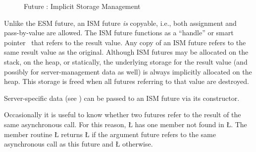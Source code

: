 \documentclass[openright,twoside]{report}
\begin{document}
\begin{figure}
%
%
%
%
%
%
\vspace{-3mm}
\caption{Future : Implicit Storage Management}
\label{f:FutureImplicitStorageManagement}
\end{figure}

Unlike the ESM future, an ISM future \emph{is} copyable, i.e., both assignment and pass-by-value are allowed.
The ISM future functions as a ``handle'' or smart pointer~\cite{Alexandrescu01} that refers to the result value.
Any copy of an ISM future refers to the same result value as the original.
Although ISM futures may be allocated on the stack, on the heap, or statically, the underlying storage for the result value (and possibly for server-management data as well) is always implicitly allocated on the heap.
This storage is freed when all futures referring to that value are destroyed.

Server-specific data (see ) can be passed to an ISM future via its constructor.

Occasionally it is useful to know whether two futures refer to the result of the same asynchronous call.
For this reason, \LGinlinetrue\LGbegin\lgrinde\L{}\endlgrinde\LGend{} has one member not found in \LGinlinetrue\LGbegin\lgrinde\L{}\endlgrinde\LGend{}.
The member routine \LGinlinetrue\LGbegin\lgrinde\L{}\endlgrinde\LGend{} returns \LGinlinetrue\LGbegin\lgrinde\L{}\endlgrinde\LGend{} if the argument future refers to the same asynchronous call as this future and \LGinlinetrue\LGbegin\lgrinde\L{}\endlgrinde\LGend{} otherwise.
\end{document}
